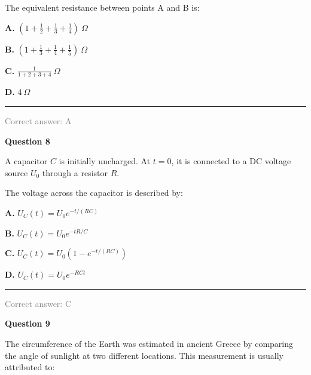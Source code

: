 \documentclass[11pt,a4paper]{article}
\newcommand{\answernote}[1]{%
\vfill
\noindent\textcolor{gray}{\rule{\linewidth}{0.4pt}}

{\small\textcolor{gray}{Correct answer: #1}}
}
\begin{document}
The equivalent resistance between points A and B is:

\vspace{0.5em}

{\large
\textbf{A.} $\left(1+\frac12+\frac13+\frac14\right)\ \Omega$

\textbf{B.} $\left(1+\frac13+\frac14+\frac15\right)\ \Omega$

\textbf{C.} $\frac{1}{1+2+3+4}\ \Omega$

\textbf{D.} $4\ \Omega$
}

\answernote{A}
\newpage

{\LARGE\textbf{Question 8}}

A capacitor $C$ is initially uncharged. At $t=0$, it is connected to a DC voltage source $U_0$ through a resistor $R$.

\begin{center}
\end{center}

The voltage across the capacitor is described by:

\vspace{0.5em}

{\large
\textbf{A.} $U_C(t)=U_0 e^{-t/(RC)}$

\textbf{B.} $U_C(t)=U_0 e^{-tR/C}$

\textbf{C.} $U_C(t)=U_0\left(1-e^{-t/(RC)}\right)$

\textbf{D.} $U_C(t)=U_0 e^{-RCt}$
}

\answernote{C}
\newpage

{\LARGE\textbf{Question 9}}

The circumference of the Earth was estimated in ancient Greece by comparing the angle of sunlight at two different locations. This measurement is usually attributed to:
\end{document}
